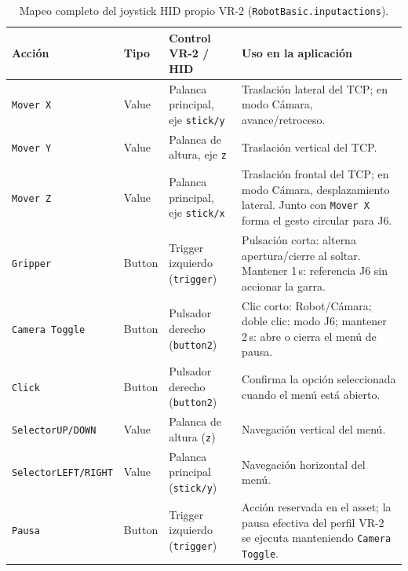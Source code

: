 \documentclass[12pt]{article}
\begin{document}
\begin{table}[H]
\centering
\small
\caption{Mapeo completo del joystick HID propio VR-2 (\texttt{RobotBasic.inputactions}).}
\label{tab:inputactions_rpi}
\begin{tabularx}{\linewidth}{|l|l|p{3.2cm}|X|}
\hline
\textbf{Acción} & \textbf{Tipo} & \textbf{Control VR-2 / HID} & \textbf{Uso en la aplicación} \\
\hline
\texttt{Mover X}            & Value  & Palanca principal, eje \texttt{stick/y}  & Traslación lateral del TCP; en modo Cámara, avance/retroceso. \\
\hline
\texttt{Mover Y}            & Value  & Palanca de altura, eje \texttt{z}        & Traslación vertical del TCP. \\
\hline
\texttt{Mover Z}            & Value  & Palanca principal, eje \texttt{stick/x}  & Traslación frontal del TCP; en modo Cámara, desplazamiento lateral. Junto con \texttt{Mover X} forma el gesto circular para J6. \\
\hline
\texttt{Gripper}            & Button & Trigger izquierdo (\texttt{trigger})     & Pulsación corta: alterna apertura/cierre al soltar. Mantener 1\,s: referencia J6 sin accionar la garra. \\
\hline
\texttt{Camera Toggle}      & Button & Pulsador derecho (\texttt{button2})      & Clic corto: Robot/Cámara; doble clic: modo J6; mantener 2\,s: abre o cierra el menú de pausa. \\
\hline
\texttt{Click}              & Button & Pulsador derecho (\texttt{button2})      & Confirma la opción seleccionada cuando el menú está abierto. \\
\hline
\texttt{SelectorUP/DOWN}    & Value  & Palanca de altura (\texttt{z})           & Navegación vertical del menú. \\
\hline
\texttt{SelectorLEFT/RIGHT} & Value  & Palanca principal (\texttt{stick/y})     & Navegación horizontal del menú. \\
\hline
\texttt{Pausa}              & Button & Trigger izquierdo (\texttt{trigger})     & Acción reservada en el asset; la pausa efectiva del perfil VR-2 se ejecuta manteniendo \texttt{Camera Toggle}. \\
\hline
\end{tabularx}
\end{table}
\end{document}
